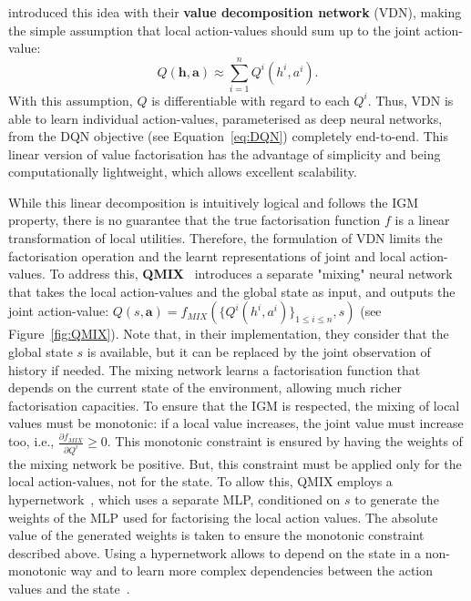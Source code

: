 \cite{Sunehag2018_VDN} introduced this idea with their \textbf{value decomposition network} (VDN), making the simple assumption that local action-values should sum up to the joint action-value:
\begin{equation}
    Q(\mathbf{h},\mathbf{a})\approx\sum_{i=1}^nQ^i(h^i,a^i).\label{eq:VDN}
\end{equation}
With this assumption, $Q$ is differentiable with regard to each $Q^i$. Thus, VDN is able to learn individual action-values, parameterised as deep neural networks, from the DQN objective (see Equation~\ref{eq:DQN}) completely end-to-end. This linear version of value factorisation has the advantage of simplicity and being computationally lightweight, which allows excellent scalability. 

While this linear decomposition is intuitively logical and follows the IGM property, there is no guarantee that the true factorisation function $f$ is a linear transformation of local utilities. Therefore, the formulation of VDN limits the factorisation operation and the learnt representations of joint and local action-values. To address this, \textbf{QMIX}~\citep{Rashid2018_QMIX} introduces a separate "mixing" neural network that takes the local action-values and the global state as input, and outputs the joint action-value: $Q(s,\mathbf{a})=f_{MIX}(\{Q^i(h^i,a^i)\}_{1\leq i\leq n},s)$ (see Figure~\ref{fig:QMIX}). Note that, in their implementation, they consider that the global state $s$ is available, but it can be replaced by the joint observation of history if needed. The mixing network learns a factorisation function that depends on the current state of the environment, allowing much richer factorisation capacities. To ensure that the IGM is respected, the mixing of local values must be monotonic: if a local value increases, the joint value must increase too, i.e., $\frac{\partial f_{MIX}}{\partial Q^i}\geq 0$. This monotonic constraint is ensured by having the weights of the mixing network be positive. But, this constraint must be applied only for the local action-values, not for the state. To allow this, QMIX employs a hypernetwork~\citep{Ha2017_Hypernetworks}, which uses a separate MLP, conditioned on $s$ to generate the weights of the MLP used for factorising the local action values. The absolute value of the generated weights is taken to ensure the monotonic constraint described above. Using a hypernetwork allows to depend on the state in a non-monotonic way and to learn more complex dependencies between the action values and the state~\citep{Zhou2020_LICA}. 


